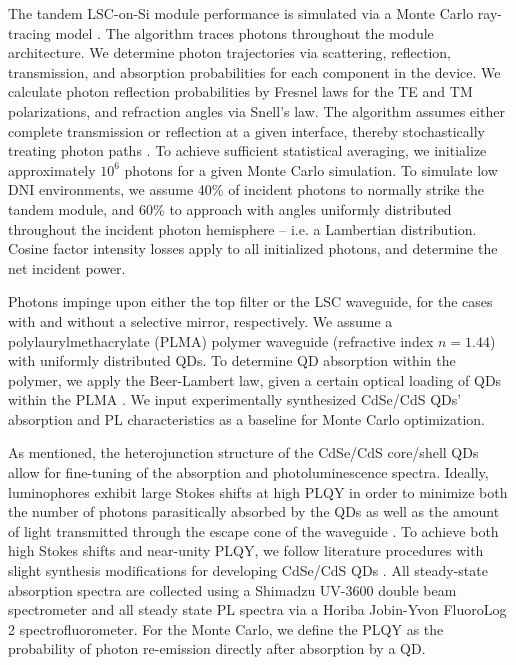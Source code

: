 \documentclass[conference]{./pvsctran}
\begin{document}
		The tandem LSC-on-Si module performance is simulated via a Monte Carlo ray-tracing model \cite{Gallagher2004, Papakonstantinou2015, Richards2007}. The algorithm traces photons throughout the module architecture. We determine photon trajectories via scattering, reflection, transmission, and absorption probabilities for each component in the device. We calculate photon reflection probabilities by Fresnel laws for the TE and TM polarizations, and refraction angles via Snell’s law. The algorithm assumes either complete transmission or reflection at a given interface, thereby stochastically treating photon paths \cite{Coropceanu2014, Sholin2007}.  To achieve sufficient statistical averaging, we initialize approximately $10^6$ photons for a given Monte Carlo simulation. To simulate low DNI environments, we assume 40\% of incident photons to normally strike the tandem module, and 60\% to approach with angles uniformly distributed throughout the incident photon hemisphere – i.e. a Lambertian distribution. Cosine factor intensity losses apply to all initialized photons, and determine the net incident power. 
		
		Photons impinge upon either the top filter or the LSC waveguide, for the cases with and without a selective mirror, respectively. We assume a polylaurylmethacrylate  (PLMA) polymer waveguide (refractive index $n = 1.44$) with uniformly distributed QDs. To determine QD absorption within the polymer, we apply the Beer-Lambert law, given a certain optical loading of QDs within the PLMA \cite{Zhou2016}. We input experimentally synthesized CdSe/CdS QDs' absorption and PL characteristics as a baseline for Monte Carlo optimization. 
		
		As mentioned, the heterojunction structure of the CdSe/CdS core/shell QDs allow for fine-tuning of the absorption and photoluminescence spectra. Ideally, luminophores exhibit large Stokes shifts at high PLQY in order to minimize both the number of photons parasitically absorbed by the QDs as well as the amount of light transmitted through the escape cone of the waveguide \cite{Bomm2010}.  To achieve both high Stokes shifts and near-unity PLQY, we follow literature procedures with slight synthesis modifications for developing CdSe/CdS QDs \cite{Chen2013, Jasieniak2009}.  All steady-state absorption spectra are collected using a Shimadzu UV-3600 double beam spectrometer and all steady state PL spectra via a Horiba Jobin-Yvon FluoroLog 2 spectrofluorometer. For the Monte Carlo, we define the PLQY as the probability of photon re-emission directly after absorption by a QD.
		
\end{document}
